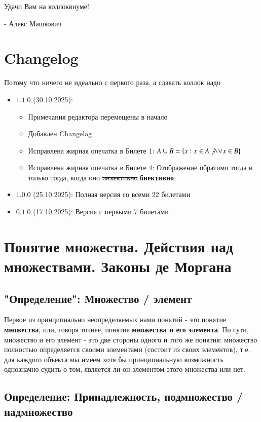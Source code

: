 \documentclass{article}
\begin{document}
Удачи Вам на коллоквиуме!

\hspace*{\fill} - Алекс Машкович


\newpage
\section*{Changelog}
Потому что ничего не идеально с первого раза, а сдавать коллок надо
\begin{itemize}
\item $\mathbf{1.1.0}$ (30.10.2025): \begin{itemize}
\item Примечания редактора перемещены в начало
\item Добавлен Changelog
\item Исправлена жирная опечатка в Билете 1: $A \cup B = \{x : x \in A \not\wedge \mathbf{\vee} x \in B \}$
\item Исправлена жирная опечатка в Билете 4: Отображение обратимо тогда и только тогда, когда оно \sout{инъективно} \textbf{биективно}.
\end{itemize}
\item $\mathbf{1.0.0}$ (25.10.2025): Полная версия со всеми 22 билетами
\item $\mathbf{0.1.0}$ (17.10.2025): Версия с первыми 7 билетами
\end{itemize}

\newpage
\section{Понятие множества. Действия над множествами. Законы де Моргана}
\subsection{"Определение": Множество / элемент}
Первое из принципиально неопределяемых нами понятий - это понятие \textbf{множества}, или, говоря точнее, понятие \textbf{множества и его элемента}. По сути, множество и его элемент - это две стороны одного и того же понятия: множество полностью определяется своими элементами (состоит из своих элементов), т.е. для каждого объекта мы имеем хотя бы принципиальную возможность однозначно судить о том, является ли он элементом этого множества или нет.

\subsection{Определение: Принадлежность, подмножество / надмножество}
\end{document}
